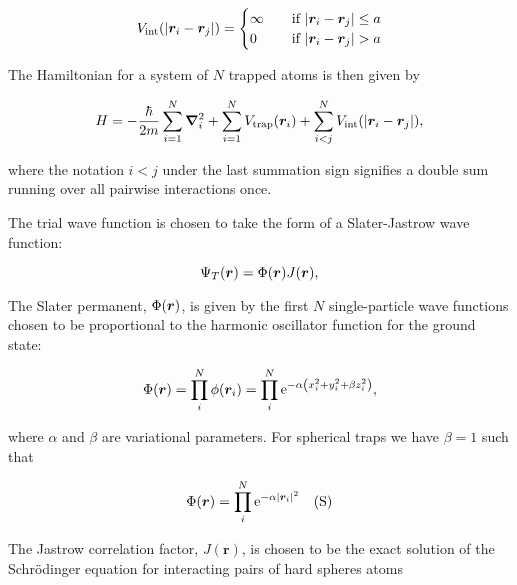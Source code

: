 \begin{equation}\label{eq:Vint}
    V_\mathrm{int} \qty(\abs{\bm{r}_i - \bm{r}_j}) = 
    \begin{cases}
        \infty \quad &\text{if } \abs{\bm{r}_i - \bm{r}_j} \leq a
        \\
        0 \quad &\text{if } \abs{\bm{r}_i - \bm{r}_j} > a
    \end{cases}
\end{equation}

The Hamiltonian for a system of $N$ trapped atoms is then given by

\begin{equation}\label{eq:full_hamiltonian}
    H = - \frac{\hbar}{2m} \sum_{i=1}^{N} \grad^2_i + \sum_{i=1}^{N} V_\mathrm{trap}\qty(\bm{r}_i) + \sum_{i < j}^{N} V_\mathrm{int} \qty(\abs{\bm{r}_i - \bm{r}_j}),
\end{equation}

where the notation $i<j$ under the last summation sign signifies a double sum running over all pairwise interactions once. 

The trial wave function is chosen to take the form of a Slater-Jastrow wave function: 

\begin{equation}\label{eq:twf}
    \Psi_T (\bm{r}) = \Phi \qty(\bm{r}) J \qty(\bm{r}), 
\end{equation}

The Slater permanent, $\Phi \qty(\bm{r})$, is given by the first $N$ single-particle wave functions chosen to be proportional to the harmonic oscillator function for the ground state: 

\begin{equation}\label{eq:slater}
    \Phi \qty(\bm{r}) = \prod_i^N \phi \qty(\bm{r}_i) = \prod_i^N \mathrm{e}^{-\alpha \qty(x_i^2 + y_i^2 + \beta z_i^2)},
\end{equation}

where $\alpha$ and $\beta$ are variational parameters. For spherical traps we have $\beta = 1$ such that

\begin{equation}\label{eq:slater_spherical}
    \Phi \qty(\bm{r}) =  \prod_i^N \mathrm{e}^{-\alpha \abs{\bm{r}_i}^2} \quad \text{(S)}
\end{equation} 

The Jastrow correlation factor, $J(\bm{r})$, is chosen to be the exact solution of the Schrödinger equation for interacting pairs of hard spheres atoms

